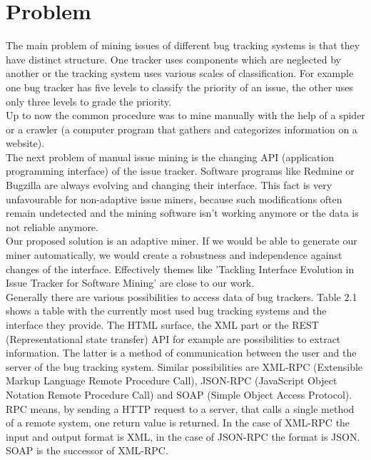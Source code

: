 \section{Problem}
\label{Problem}
The main problem of mining issues of different bug tracking systems is that they have distinct structure. One tracker uses components which are neglected by another or the tracking system uses various scales of classification. For example one bug tracker has five levels to classify the priority of an issue, the other uses only three levels to grade the priority. \\Up to now the common procedure was to mine manually with the help of a spider or a crawler (a computer program that gathers and categorizes information on a website). 
\\
 The next problem of manual issue mining is the changing API (application programming interface) of the issue tracker. Software programs like Redmine or Bugzilla are always evolving and changing their interface. This fact is very unfavourable for non-adaptive issue miners, because such modifications often remain undetected and the mining software isn't working anymore or the data is not reliable anymore. \\ Our proposed solution is an adaptive miner. If we would be able to generate our miner automatically, we would create a robustness and independence against changes of the interface. Effectively themes like 'Tackling Interface Evolution in Issue Tracker for Software Mining' are close to our work. \\
Generally there are various possibilities to access data of bug trackers. Table 2.1 shows a table with the currently most used bug tracking systems and the interface they provide.
The HTML surface, the XML part or the REST (Representational state transfer) API for example are possibilities to extract information. The latter is a method of communication between the user and the server of the bug tracking system. Similar possibilities are XML-RPC (Extensible Markup Language Remote Procedure Call), JSON-RPC (JavaScript Object Notation Remote Procedure Call) and SOAP (Simple Object Access Protocol). RPC means, by sending a HTTP request to a server, that calls a single method of a remote system, one return value is returned. In the case of XML-RPC the input and output format is XML, in the case of JSON-RPC the format is JSON. SOAP is the successor of XML-RPC.  \\
